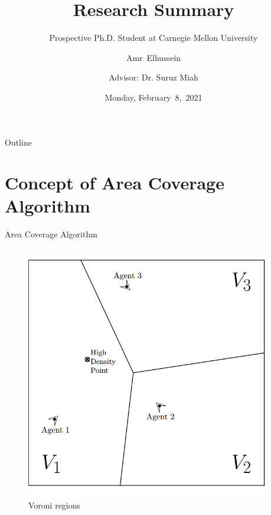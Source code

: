 \documentclass{beamer}
\title{Research Summary}
\subtitle{Prospective Ph.D. Student at Carnegie Mellon University}
\author[A.Elhussein]{Amr~Elhussein  \\\and
Advisor: Dr. Suruz Miah}
\institute[Bradley University] %
{
  Department of Electrical and Computer Engineering\\
  Bradley University\\
  1501 W. Bradley Avenue\\
  Peoria, IL, 61625, USA
}
\date[February~8,~2021]{Monday, February~8,~2021}
\begin{document}
\begin{frame}
  \titlepage
\end{frame}

\begin{frame}{Outline}
  \tableofcontents
\end{frame}


\section{Concept of Area Coverage Algorithm}
\begin{frame}{Area Coverage Algorithm}
\begin{columns}
\begin{column}{0.5\textwidth}
\begin{center}
\begin{figure}
\includegraphics[scale=0.2]{figs/img/voroni.png}
\caption{Voroni regions}
\end{figure}
\end{center}
\end{column}
\begin{column}{0.5\textwidth}
\begin{center}

\end{center}
\end{column}
\end{columns}
\end{frame}
\end{document}

